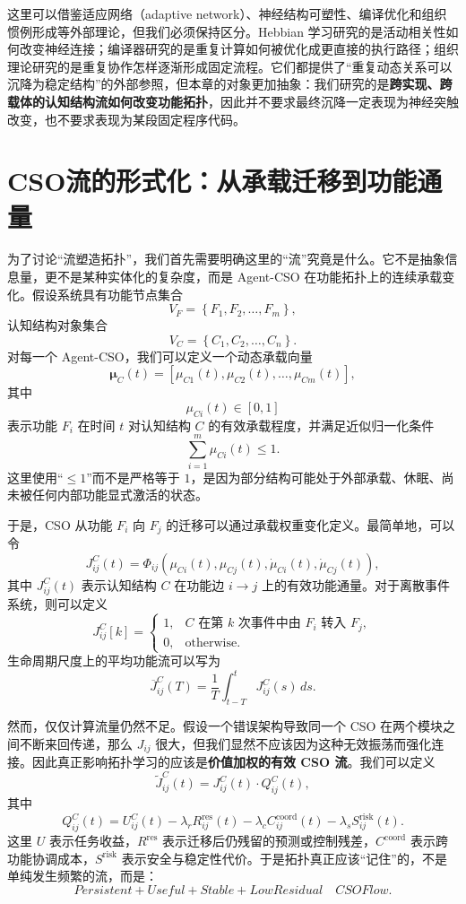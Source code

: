 这里可以借鉴适应网络（adaptive network）、神经结构可塑性、编译优化和组织惯例形成等外部理论，但我们必须保持区分。Hebbian 学习研究的是活动相关性如何改变神经连接；编译器研究的是重复计算如何被优化成更直接的执行路径；组织理论研究的是重复协作怎样逐渐形成固定流程。它们都提供了``重复动态关系可以沉降为稳定结构''的外部参照，但本章的对象更加抽象：我们研究的是\textbf{跨实现、跨载体的认知结构流如何改变功能拓扑}，因此并不要求最终沉降一定表现为神经突触改变，也不要求表现为某段固定程序代码。


\section{CSO流的形式化：从承载迁移到功能通量}

为了讨论``流塑造拓扑''，我们首先需要明确这里的``流''究竟是什么。它不是抽象信息量，更不是某种实体化的复杂度，而是 Agent-CSO 在功能拓扑上的连续承载变化。假设系统具有功能节点集合
\[
V_F
=
\left\{
F_1,F_2,\ldots,F_m
\right\},
\]
认知结构对象集合
\[
V_C
=
\left\{
C_1,C_2,\ldots,C_n
\right\}.
\]
对每一个 Agent-CSO，我们可以定义一个动态承载向量
\[
\boldsymbol{\mu}_{C}(t)
=
\left[
\mu_{C1}(t),
\mu_{C2}(t),
\ldots,
\mu_{Cm}(t)
\right],
\]
其中
\[
\mu_{Ci}(t)\in[0,1]
\]
表示功能 $F_i$ 在时间 $t$ 对认知结构 $C$ 的有效承载程度，并满足近似归一化条件
\[
\sum_{i=1}^{m}
\mu_{Ci}(t)
\leq 1.
\]
这里使用``$\leq 1$''而不是严格等于 $1$，是因为部分结构可能处于外部承载、休眠、尚未被任何内部功能显式激活的状态。

于是，CSO 从功能 $F_i$ 向 $F_j$ 的迁移可以通过承载权重变化定义。最简单地，可以令
\[
J_{ij}^{C}(t)
=
\Phi_{ij}
\left(
\mu_{Ci}(t),
\mu_{Cj}(t),
\dot{\mu}_{Ci}(t),
\dot{\mu}_{Cj}(t)
\right),
\]
其中 $J_{ij}^{C}(t)$ 表示认知结构 $C$ 在功能边 $i\rightarrow j$ 上的有效功能通量。对于离散事件系统，则可以定义
\[
J_{ij}^{C}[k]
=
\begin{cases}
1,&
C\text{ 在第 }k\text{ 次事件中由 }F_i
\text{ 转入 }F_j,\\
0,&
\text{otherwise}.
\end{cases}
\]
生命周期尺度上的平均功能流可以写为
\[
\overline{J}_{ij}^{C}(T)
=
\frac{1}{T}
\int_{t-T}^{t}
J_{ij}^{C}(s)\,ds.
\]

然而，仅仅计算流量仍然不足。假设一个错误架构导致同一个 CSO 在两个模块之间不断来回传递，那么 $J_{ij}$ 很大，但我们显然不应该因为这种无效振荡而强化连接。因此真正影响拓扑学习的应该是\textbf{价值加权的有效 CSO 流}。我们可以定义
\[
\widetilde{J}_{ij}^{C}(t)
=
J_{ij}^{C}(t)
\cdot
Q_{ij}^{C}(t),
\]
其中
\[
Q_{ij}^{C}(t)
=
U_{ij}^{C}(t)
-
\lambda_r R_{ij}^{\mathrm{res}}(t)
-
\lambda_c C_{ij}^{\mathrm{coord}}(t)
-
\lambda_s S_{ij}^{\mathrm{risk}}(t).
\]
这里 $U$ 表示任务收益，$R^{\mathrm{res}}$ 表示迁移后仍残留的预测或控制残差，$C^{\mathrm{coord}}$ 表示跨功能协调成本，$S^{\mathrm{risk}}$ 表示安全与稳定性代价。于是拓扑真正应该``记住''的，不是单纯发生频繁的流，而是：
\[
\boxed{
Persistent
+
Useful
+
Stable
+
LowResidual
\quad
CSOFlow.
}
\]

